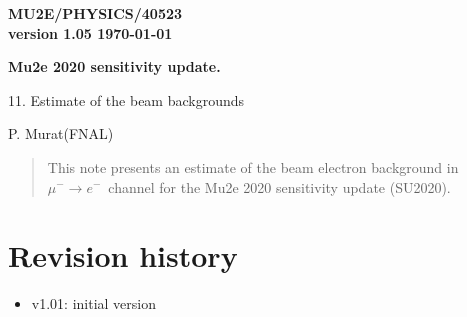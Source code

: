 \documentclass[12pt]{article}
\newcommand {\MuToEm}     {\mbox{$\mu^- \ra e^-$}}
\newcommand {\ra}        {\rightarrow}
\begin{document}
\begin{titlepage}
  \begin{flushright}
    \bf {MU2E/PHYSICS/40523} \\
    version 1.05
    \today
 \end{flushright}

  \vspace{1cm}

  \begin{center}
    {\Large \bf Mu2e 2020 sensitivity update.

      \vspace{0.3in}

      11. Estimate of the beam backgrounds
    }

    \vspace{1cm}

    P. Murat(FNAL)

    \vspace{0.3cm}

    \vspace{0.8cm}
  \end{center}

  \begin{abstract}
    This note presents an estimate of the beam electron background in \MuToEm\ channel
    for the Mu2e 2020 sensitivity update (SU2020).
    \vspace{0.2in}
  \end{abstract}

\end{titlepage}
%
%
%
{\tableofcontents}

% 

\newpage
\section {Revision history}
\begin{itemize}
\item
  v1.01: initial version
\end{itemize}
\end{document}
